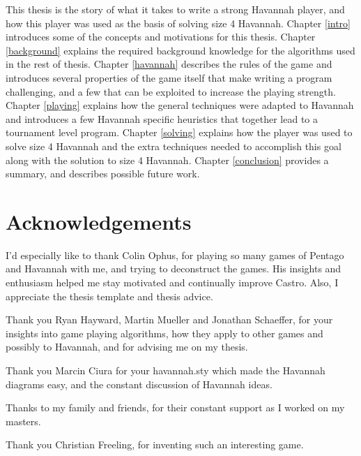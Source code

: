This thesis is the story of what it takes to write a strong Havannah player, and how this player was used as the basis of solving size 4 Havannah. Chapter \ref{intro} introduces some of the concepts and motivations for this thesis. Chapter \ref{background} explains the required background knowledge for the algorithms used in the rest of thesis. Chapter \ref{havannah} describes the rules of the game and introduces several properties of the game itself that make writing a program challenging, and a few that can be exploited to increase the playing strength. Chapter \ref{playing} explains how the general techniques were adapted to Havannah and introduces a few Havannah specific heuristics that together lead to a tournament level program. Chapter \ref{solving} explains how the player was used to solve size 4 Havannah and the extra techniques needed to accomplish this goal along with the solution to size 4 Havannah. Chapter \ref{conclusion} provides a summary, and describes possible future work.



  \newpage
   \chapter*{Acknowledgements}
   \thispagestyle{empty}
   \vspace*{-0.7in}
   \small{

I'd especially like to thank Colin Ophus, for playing so many games of Pentago and Havannah with me, and trying to deconstruct the games. His insights and enthusiasm helped me stay motivated and continually improve Castro. Also, I appreciate the thesis template and thesis advice.

Thank you Ryan Hayward, Martin Mueller and Jonathan Schaeffer, for your insights into game playing algorithms, how they apply to other games and possibly to Havannah, and for advising me on my thesis.

Thank you Marcin Ciura for your havannah.sty which made the Havannah diagrams easy, and the constant discussion of Havannah ideas.

Thanks to my family and friends, for their constant support as I worked on my masters.

Thank you Christian Freeling, for inventing such an interesting game.

   }

